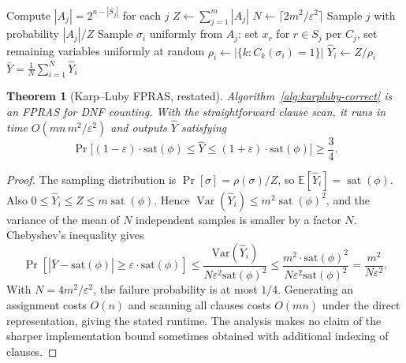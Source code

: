 \documentclass[twoside,12pt]{book}
\theoremstyle{plain}
\newtheorem{theorem}{Theorem}[chapter]
\theoremstyle{definition}
\theoremstyle{remark}
\begin{document}
\begin{algorithm}
\caption{Karp--Luby DNF Counting (Corrected)}
\label{alg:karpluby-correct}
\begin{algorithmic}[1]
    \State Compute $|A_j| = 2^{n - |S_j|}$ for each $j$
    \State $Z \gets \sum_{j=1}^m |A_j|$
    \State $N \gets \lceil 2m^2 / \varepsilon^2 \rceil$
        \State Sample $j$ with probability $|A_j|/Z$
        \State Sample $\sigma_i$ uniformly from $A_j$: set $x_r$ for $r \in S_j$ per $C_j$, set remaining variables uniformly at random
        \State $\rho_i \gets |\{k : C_k(\sigma_i) = 1\}|$ 
        \State $\hat{Y}_i \gets Z / \rho_i$
    \EndFor
    \State \Return $\bar{Y} = \frac{1}{N} \sum_{i=1}^N \hat{Y}_i$
\EndFunction
\end{algorithmic}
\end{algorithm}

\begin{theorem}[Karp--Luby FPRAS, restated]
\label{thm:karpluby2}
Algorithm~\ref{alg:karpluby-correct} is an FPRAS for DNF counting. With the
straightforward clause scan, it runs in time
$O(mn\,m^2/\varepsilon^2)$ and outputs $\hat{Y}$ satisfying
\[
\Pr\!\bigl[(1 - \varepsilon) \cdot \text{sat}(\phi) \leq \hat{Y} \leq (1 + \varepsilon) \cdot \text{sat}(\phi)\bigr] \geq \frac{3}{4}.
\]
\end{theorem}

\begin{proof}
The sampling distribution is $\Pr[\sigma]=\rho(\sigma)/Z$, so
$\mathbb{E}[\hat{Y}_i]=\operatorname{sat}(\phi)$. Also
$0\leq\hat{Y}_i\leq Z\leq m\operatorname{sat}(\phi)$. Hence
$\operatorname{Var}(\hat{Y}_i)\leq m^2\operatorname{sat}(\phi)^2$, and the
variance of the mean of $N$ independent samples is smaller by a factor $N$.
Chebyshev's inequality gives
\[
\Pr\!\left[\left|\bar{Y} - \text{sat}(\phi)\right| \geq \varepsilon \cdot \text{sat}(\phi)\right] \leq \frac{\mathrm{Var}(\hat{Y}_i)}{N \varepsilon^2 \text{sat}(\phi)^2} \leq \frac{m^2 \cdot \text{sat}(\phi)^2}{N \varepsilon^2 \text{sat}(\phi)^2} = \frac{m^2}{N \varepsilon^2}.
\]
With $N=4m^2/\varepsilon^2$, the failure probability is at most $1/4$.
Generating an assignment costs $O(n)$ and scanning all clauses costs $O(mn)$
under the direct representation, giving the stated runtime. The analysis makes
no claim of the sharper implementation bound sometimes obtained with
additional indexing of clauses.
\end{proof}
\end{document}
